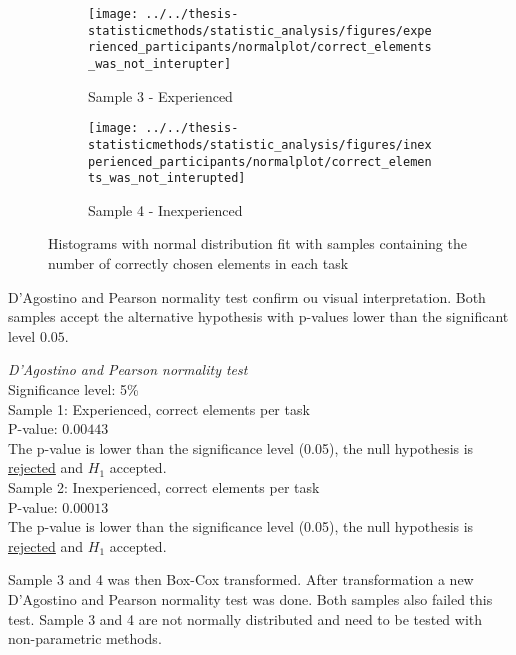 \begin{figure}[h!]
	\centering
	\begin{subfigure}[b]{0.48\textwidth}
		\centering
		\texttt{[image: ../../thesis-statisticmethods/statistic\_analysis/figures/experienced\_participants/normalplot/correct\_elements\_was\_not\_interupter]}
		\caption{Sample 3 - Experienced}
		\label{fig:correctelementswasnotinterupter_ex}
	\end{subfigure}
	\begin{subfigure}[b]{0.48\textwidth}
		\centering
		\texttt{[image: ../../thesis-statisticmethods/statistic\_analysis/figures/inexperienced\_participants/normalplot/correct\_elements\_was\_not\_interupted]}
		\caption{Sample 4 - Inexperienced}
		\label{fig:correctelementswasnotinterupted_inex}
	\end{subfigure}
	\caption{Histograms with normal distribution fit with samples containing the number of correctly chosen elements in each task}
\end{figure}

D'Agostino and Pearson normality test confirm ou visual interpretation. Both samples accept the alternative hypothesis with p-values lower than the significant level $0.05$. \\[0.5cm]

\begin{center}
	\begin{tcolorbox}[box align=center,width=\textwidth-5cm]
		\centering
		\textit{D'Agostino and Pearson normality test}\\
		Significance level: 5\%  \\[0.5cm]
		
		Sample 1: Experienced, correct elements per task\\
		P-value: $0.00443$\\
		The p-value is lower than the significance level (0.05), the null hypothesis is \underline{rejected} and $H_1$ accepted.\\[0.5cm]
		
		Sample 2: Inexperienced, correct elements per task \\
		P-value: $0.00013$ \\
		The p-value is lower than the significance level (0.05), the null hypothesis is \underline{rejected} and $H_1$ accepted.\\[0.5cm]
	\end{tcolorbox} 
\end{center}


Sample 3 and 4 was then Box-Cox transformed. After transformation a new D'Agostino and Pearson normality test was done. Both samples also failed this test. Sample 3 and 4 are not normally distributed and need to be tested with non-parametric methods. 

